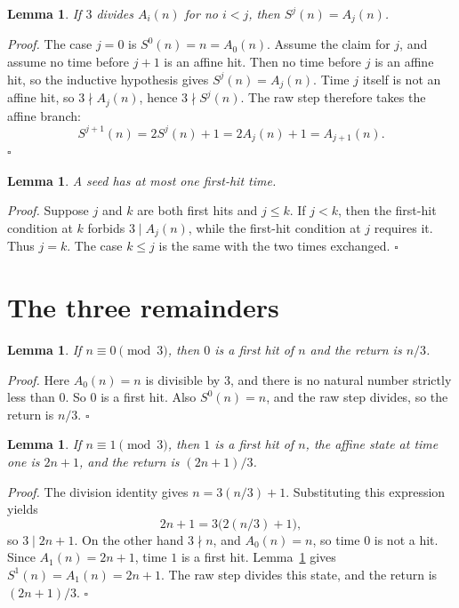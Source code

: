 \documentclass[11pt,letterpaper]{article}
\newtheorem{lemma}[theorem]{Lemma}
\newenvironment{proof}{\noindent\textit{Proof.}}{\hfill\(\square\)}
\begin{document}
\begin{lemma}
\label{lem:prefix}
If \(3\) divides \(A_{i}(n)\) for no \(i<j\), then \(S^{j}(n)=A_{j}(n)\).
\end{lemma}

\begin{proof}
The case \(j=0\) is \(S^{0}(n)=n=A_{0}(n)\). Assume the claim for \(j\), and assume no time before \(j+1\) is an affine hit. Then no time before \(j\) is an affine hit, so the inductive hypothesis gives \(S^{j}(n)=A_{j}(n)\). Time \(j\) itself is not an affine hit, so \(3\nmid A_{j}(n)\), hence \(3\nmid S^{j}(n)\). The raw step therefore takes the affine branch:
\[
  S^{j+1}(n)=2S^{j}(n)+1=2A_{j}(n)+1=A_{j+1}(n).
\]
\end{proof}

\begin{lemma}
\label{lem:unique}
A seed has at most one first-hit time.
\end{lemma}

\begin{proof}
Suppose \(j\) and \(k\) are both first hits and \(j\le k\). If \(j<k\), then the first-hit condition at \(k\) forbids \(3\mid A_{j}(n)\), while the first-hit condition at \(j\) requires it. Thus \(j=k\). The case \(k\le j\) is the same with the two times exchanged.
\end{proof}

\section{The three remainders}

\begin{lemma}
\label{lem:zero}
If \(n\equiv 0\pmod{3}\), then \(0\) is a first hit of \(n\) and the return is \(n/3\).
\end{lemma}

\begin{proof}
Here \(A_{0}(n)=n\) is divisible by \(3\), and there is no natural number strictly less than \(0\). So \(0\) is a first hit. Also \(S^{0}(n)=n\), and the raw step divides, so the return is \(n/3\).
\end{proof}

\begin{lemma}
\label{lem:one}
If \(n\equiv 1\pmod{3}\), then \(1\) is a first hit of \(n\), the affine state at time one is \(2n+1\), and the return is \((2n+1)/3\).
\end{lemma}

\begin{proof}
The division identity gives \(n=3(n/3)+1\). Substituting this expression yields
\[
  2n+1=3\bigl(2(n/3)+1\bigr),
\]
so \(3\mid 2n+1\). On the other hand \(3\nmid n\), and \(A_{0}(n)=n\), so time \(0\) is not a hit. Since \(A_{1}(n)=2n+1\), time \(1\) is a first hit. Lemma~\ref{lem:prefix} gives \(S^{1}(n)=A_{1}(n)=2n+1\). The raw step divides this state, and the return is \((2n+1)/3\).
\end{proof}
\end{document}
